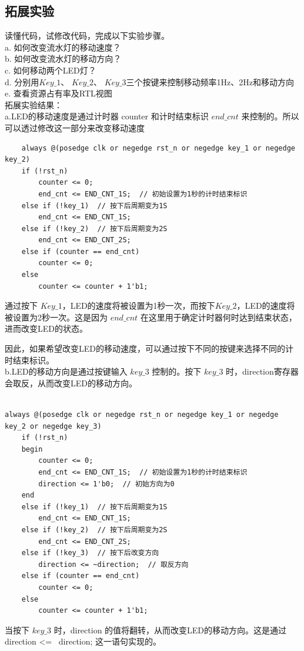 \documentclass[12pt]{article}
\begin{document}
\subsection{拓展实验}
读懂代码，试修改代码，完成以下实验步骤。\\
a.	如何改变流水灯的移动速度？\\
b.	如何改变流水灯的移动方向？\\
c.	如何移动两个LED灯？\\
d.	分别用$Key\_1$、 $Key\_2$、 $Key\_3$三个按键来控制移动频率1Hz、2Hz和移动方向\\
e.	查看资源占有率及RTL视图\\
拓展实验结果：\\
a.LED的移动速度是通过计时器 counter 和计时结束标识 $end\_cnt$ 来控制的。所以可以透过修改这一部分来改变移动速度
\begin{lstlisting}
    always @(posedge clk or negedge rst_n or negedge key_1 or negedge key_2)
    if (!rst_n)
        counter <= 0;
        end_cnt <= END_CNT_1S;  // 初始设置为1秒的计时结束标识
    else if (!key_1)  // 按下后周期变为1S
        end_cnt <= END_CNT_1S;
    else if (!key_2)  // 按下后周期变为2S
        end_cnt <= END_CNT_2S;
    else if (counter == end_cnt)
        counter <= 0;
    else 
        counter <= counter + 1'b1;

\end{lstlisting}

通过按下 $Key\_1$，LED的速度将被设置为1秒一次，而按下$Key\_2$，LED的速度将被设置为2秒一次。这是因为 $end\_cnt$ 在这里用于确定计时器何时达到结束状态，进而改变LED的状态。

因此，如果希望改变LED的移动速度，可以通过按下不同的按键来选择不同的计时结束标识。\\

b.LED的移动方向是通过按键输入 $key\_3$ 控制的。按下 $key\_3$ 时，direction寄存器会取反，从而改变LED的移动方向。

\begin{lstlisting}

always @(posedge clk or negedge rst_n or negedge key_1 or negedge key_2 or negedge key_3)
    if (!rst_n)
    begin
        counter <= 0;
        end_cnt <= END_CNT_1S;  // 初始设置为1秒的计时结束标识
        direction <= 1'b0;  // 初始方向为0
    end
    else if (!key_1)  // 按下后周期变为1S
        end_cnt <= END_CNT_1S;
    else if (!key_2)  // 按下后周期变为2S
        end_cnt <= END_CNT_2S;
    else if (!key_3)  // 按下后改变方向
        direction <= ~direction;  // 取反方向
    else if (counter == end_cnt)
        counter <= 0;
    else 
        counter <= counter + 1'b1;

\end{lstlisting}
当按下 $key\_3$ 时，direction 的值将翻转，从而改变LED的移动方向。这是通过 direction <= ~direction; 这一语句实现的。
\end{document}
